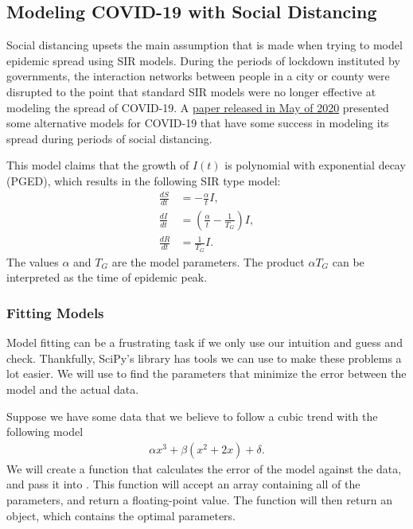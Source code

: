 \subsection*{Modeling COVID-19 with Social Distancing}

Social distancing upsets the main assumption that is made when trying to model epidemic spread using SIR models.
During the periods of lockdown instituted by governments, the interaction networks between people in a city or county were disrupted to the point that standard SIR models were no longer effective at modeling the spread of COVID-19.
A \href{https://arxiv.org/pdf/2005.06933.pdf}{paper released in May of 2020} presented some alternative models for COVID-19 that have some success in modeling its spread during periods of social distancing.

This model claims that the growth of $I(t)$ is polynomial with exponential decay (PGED),
which results in the following SIR type model:
\begin{align}
    \frac{dS}{dt} &= -\frac{\alpha}{t}I, \label{eq:sir:covid-model-1}\\
    \frac{dI}{dt} &= \left(\frac{\alpha}{t} - \frac{1}{T_G}\right)I, \label{eq:sir:covid-model-2}\\
    \frac{dR}{dt} &= \frac{1}{T_G}I. \label{eq:sir:covid-model-3}
\end{align}
The values $\alpha$ and $T_G$ are the model parameters.
The product $\alpha T_G$ can be interpreted as the time of epidemic peak.

\subsubsection*{Fitting Models}

Model fitting can be a frustrating task if we only use our intuition and guess and check.
Thankfully, SciPy's  library has tools we can use to make these problems a lot easier.
We will use  to find the parameters that minimize the error between the model and the actual data.

Suppose we have some data that we believe to follow a cubic trend with the following model
\begin{align*}
    \alpha x^3 + \beta (x^2 + 2x) + \delta.
\end{align*}
We will create a function that calculates the error of the model against the data, and pass it into .
This function will accept an array containing all of the parameters, and return a floating-point value.
The function  will then return an  object, which contains the optimal parameters.

